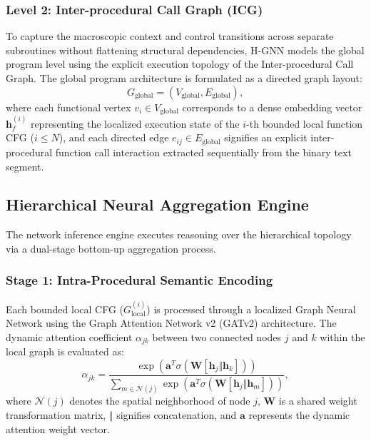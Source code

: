 \documentclass{llncs}
\begin{document}
\subsubsection{Level 2: Inter-procedural Call Graph (ICG)}
To capture the macroscopic context and control transitions across separate subroutines without flattening structural dependencies, H-GNN models the global program level using the explicit execution topology of the Inter-procedural Call Graph. The global program architecture is formulated as a directed graph layout:
\begin{equation}
G_{\text{global}} = (V_{\text{global}}, E_{\text{global}}),
\end{equation}
where each functional vertex $v_i \in V_{\text{global}}$ corresponds to a dense embedding vector $\mathbf{h}^{(i)}_{f}$ representing the localized execution state of the $i$-th bounded local function CFG ($i \le N$), and each directed edge $e_{ij} \in E_{\text{global}}$ signifies an explicit inter-procedural function call interaction extracted sequentially from the binary text segment.

\subsection{Hierarchical Neural Aggregation Engine}
The network inference engine executes reasoning over the hierarchical topology via a dual-stage bottom-up aggregation process.

\subsubsection{Stage 1: Intra-Procedural Semantic Encoding}
Each bounded local CFG ($G_{\text{local}}^{(i)}$) is processed through a localized Graph Neural Network using the Graph Attention Network v2 (GATv2) architecture. The dynamic attention coefficient $\alpha_{jk}$ between two connected nodes $j$ and $k$ within the local graph is evaluated as:
\begin{equation}
\alpha_{jk} = \frac{\exp\left(\mathbf{a}^{T} \sigma\left(\mathbf{W} [\mathbf{h}_{j} \Vert \mathbf{h}_{k}]\right)\right)}{\sum_{m \in \mathcal{N}(j)} \exp\left(\mathbf{a}^{T} \sigma\left(\mathbf{W} [\mathbf{h}_{j} \Vert \mathbf{h}_{m}]\right)\right)},
\end{equation}
where $\mathcal{N}(j)$ denotes the spatial neighborhood of node $j$, $\mathbf{W}$ is a shared weight transformation matrix, $\Vert$ signifies concatenation, and $\mathbf{a}$ represents the dynamic attention weight vector. 
\end{document}
